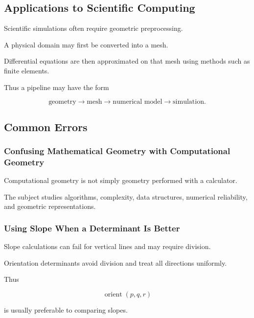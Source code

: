 \subsection{Applications to Scientific Computing}
\label{subsec:computational-geometry-scientific-computing}

Scientific simulations often require geometric preprocessing.

A physical domain may first be converted into a mesh.

Differential equations are then approximated on that mesh using methods such
as finite elements.

Thus a pipeline may have the form

\[
\boxed{
\text{geometry}
\longrightarrow
\text{mesh}
\longrightarrow
\text{numerical model}
\longrightarrow
\text{simulation}.
}
\]

\subsection{Common Errors}
\label{subsec:computational-geometry-common-errors}

\subsubsection{Confusing Mathematical Geometry with Computational Geometry}

Computational geometry is not simply geometry performed with a calculator.

The subject studies algorithms, complexity, data structures, numerical
reliability, and geometric representations.

\subsubsection{Using Slope When a Determinant Is Better}

Slope calculations can fail for vertical lines and may require division.

Orientation determinants avoid division and treat all directions uniformly.

Thus

\[
\boxed{
\operatorname{orient}(p,q,r)
}
\]

is usually preferable to comparing slopes.

